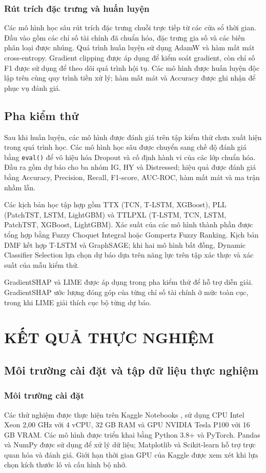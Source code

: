 \documentclass[10pt,twoside]{article}
\begin{document}
\subsubsection{Rút trích đặc trưng và huấn luyện}
Các mô hình học sâu rút trích đặc trưng chuỗi trực tiếp từ các cửa sổ thời gian. Đầu vào gồm các chỉ số tài chính đã chuẩn hóa, đặc trưng gia số và các biến phân loại được nhúng. Quá trình huấn luyện sử dụng AdamW và hàm mất mát cross-entropy. Gradient clipping được áp dụng để kiểm soát gradient, còn chỉ số F1 được sử dụng để theo dõi quá trình hội tụ. Các mô hình được huấn luyện độc lập trên cùng quy trình tiền xử lý; hàm mất mát và Accuracy được ghi nhận để phục vụ đánh giá.

\subsection{Pha kiểm thử}
Sau khi huấn luyện, các mô hình được đánh giá trên tập kiểm thử chưa xuất hiện trong quá trình học. Các mô hình học sâu được chuyển sang chế độ đánh giá bằng \texttt{eval()} để vô hiệu hóa Dropout và cố định hành vi của các lớp chuẩn hóa. Đầu ra gồm dự báo cho ba nhóm IG, HY và Distressed; hiệu quả được đánh giá bằng Accuracy, Precision, Recall, F1-score, AUC-ROC, hàm mất mát và ma trận nhầm lẫn.

Các kịch bản học tập hợp gồm TTX (TCN, T-LSTM, XGBoost), PLL (PatchTST, LSTM, LightGBM) và TTLPXL (T-LSTM, TCN, LSTM, PatchTST, XGBoost, LightGBM). Xác suất của các mô hình thành phần được tổng hợp bằng Fuzzy Choquet Integral hoặc Gompertz Fuzzy Ranking. Kịch bản DMF kết hợp T-LSTM và GraphSAGE; khi hai mô hình bất đồng, Dynamic Classifier Selection lựa chọn dự báo dựa trên năng lực trên tập xác thực và xác suất của mẫu kiểm thử.

GradientSHAP và LIME được áp dụng trong pha kiểm thử để hỗ trợ diễn giải. GradientSHAP ước lượng đóng góp của từng chỉ số tài chính ở mức toàn cục, trong khi LIME giải thích cục bộ từng dự báo.


\section{KẾT QUẢ THỰC NGHIỆM}

\subsection{Môi trường cài đặt và tập dữ liệu thực nghiệm}

\subsubsection{Môi trường cài đặt}
Các thử nghiệm được thực hiện trên Kaggle Notebooks \cite{noauthor_notebooks_nodate}, sử dụng CPU Intel Xeon 2,00 GHz với 4 vCPU, 32 GB RAM và GPU NVIDIA Tesla P100 với 16 GB VRAM. Các mô hình được triển khai bằng Python 3.8+ và PyTorch. Pandas và NumPy được sử dụng để xử lý dữ liệu; Matplotlib và Scikit-learn hỗ trợ trực quan hóa và đánh giá. Giới hạn thời gian GPU của Kaggle được xem xét khi lựa chọn kích thước lô và cấu hình bộ nhớ.
\end{document}
